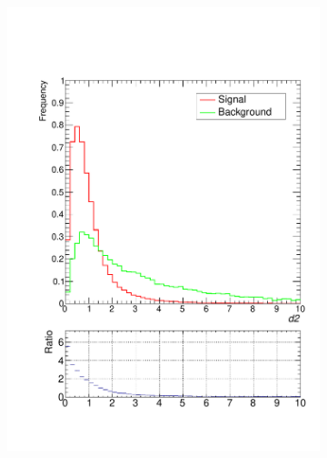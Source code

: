 \documentclass[10pt,a4paper]{book}
\begin{document}
\begin{figure}[h]
\begin{subfigure}{0.5\textwidth}
\centering
\includegraphics[scale=0.35]{ch4_images/c_d2}
\caption{}
\end{subfigure}
\begin{subfigure}{0.5\textwidth}
\centering

\end{subfigure}
\end{figure}
\end{document}
